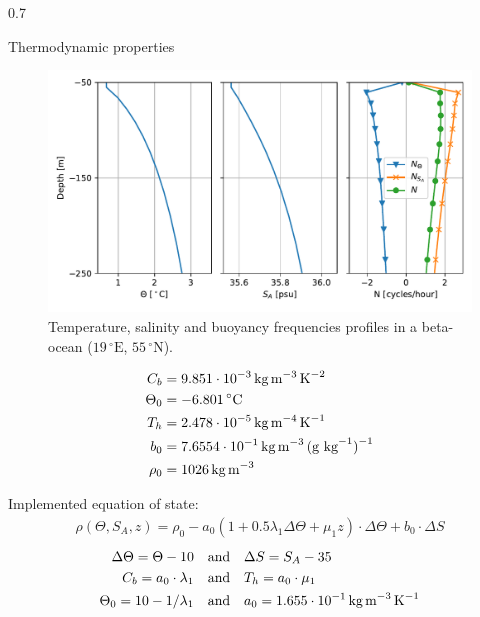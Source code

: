 \documentclass[final]{beamer}
\newlength{\colwidth}
\begin{document}
\begin{frame}[t]
\begin{columns}[t]
\begin{column}{0.7\colwidth}
\begin{exampleblock}{Thermodynamic properties}
   
    \begin{figure}
      \includegraphics[width=7in]{strati}
      \caption{Temperature, salinity and buoyancy frequencies profiles
        in a beta-ocean ($19\,^\circ\text{E}$, $55\,^\circ\text{N}$).}
    \end{figure}


    \vspace{-1.5cm}
    \begin{align*}
        C_b &= 9.851 \cdot 10^{-3} \text{\,kg}\text{\,m}^{-3}\text{\,K}^{-2} \\
        \Theta_0 &= -6.801\text{\,}^\circ\text{C} \\
        T_h &= 2.478 \cdot 10^{-5} \text{\,kg}\text{\,m}^{-4}\text{\,K}^{-1}\\
        b_0 &= 7.6554 \cdot 10^{-1} \text{\,kg\,m}^{-3}\text{\,(g kg}^{-1}\text{)}^{-1} \\
        \rho_0 &= 1026 \text{\,kg\,m}^{-3} \\
    \end{align*}

    Implemented equation of state:
    \begin{align}
      \rho(\Theta, S_A, z) =
      \rho_0 -a_{0}\left(1+0.5 \lambda_1 \Delta\Theta+\mu_{1} z\right) \cdot \Delta\Theta
      +b_{0} \cdot \Delta S      
    \end{align}
    \begin{align*}
      \Delta\Theta = \Theta - 10 &\qand
      \Delta S = S_A - 35 \\
      C_b = a_0 \cdot \lambda_1 & \qand
      T_h = a_0 \cdot \mu_1 \\
      \Theta_0 = 10 - {1}/{\lambda_1} &\qand
      a_0 = 1.655 \cdot 10^{-1} \text{\,kg\,m}^{-3}\text{\,K}^{-1} 
    \end{align*}
    

\end{exampleblock}
\end{column}
\end{columns}
\end{frame}
\end{document}
